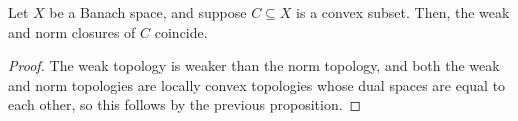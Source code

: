 \documentclass[10pt]{mypackage}
\begin{document}
\begin{theorem}
  Let $X$ be a Banach space, and suppose $C\subseteq X$ is a convex subset. Then, the weak and norm closures of $C$ coincide.
\end{theorem}
\begin{proof}
  The weak topology is weaker than the norm topology, and both the weak and norm topologies are locally convex topologies whose dual spaces are equal to each other, so this follows by the previous proposition.
\end{proof}
\nocite{conway_functional_analysis,schaefer_topological_vector_spaces,davidson_functional_analysis}
\printbibliography
\end{document}
